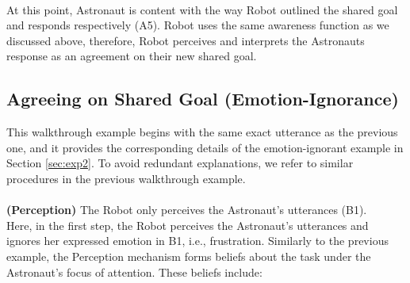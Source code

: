 \noindent{}\\

At this point, Astronaut is content with the way Robot outlined the shared goal
and responds respectively (A5). Robot uses the same awareness function as we
discussed above, therefore, Robot perceives and interprets the Astronauts
response as an agreement on their new shared goal.\\

\noindent{}

\subsection{Agreeing on Shared Goal (Emotion-Ignorance)}
\label{sec:wt-exp2}

This walkthrough example begins with the same exact utterance as the previous
one, and it provides the corresponding details of the emotion-ignorant example
in Section \ref{sec:exp2}. To avoid redundant explanations, we refer to similar
procedures in the previous walkthrough example.\\

\noindent{}\\

\noindent\textbf{(Perception)} The Robot only perceives the Astronaut's
utterances (B1).\\

Here, in the first step, the Robot perceives the Astronaut's utterances and
ignores her expressed emotion in B1, i.e., frustration. Similarly to the
previous example, the Perception mechanism forms beliefs about the task under
the Astronaut's focus of attention. These beliefs include:


